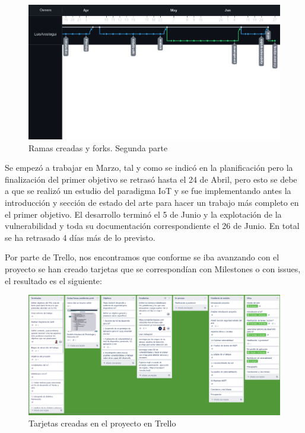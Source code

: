 \begin{figure}[ht!]
    \centering
    \includegraphics[width=\linewidth]{imagenes/canvas2.png}
    \caption{Ramas creadas y forks. Segunda parte}
    \label{fig:figure6-plan}
\end{figure}

Se empezó a trabajar en Marzo, tal y como se indicó en la planificación pero la finalización del primer objetivo se retrasó hasta el 24 de Abril, pero esto se debe a que se realizó un estudio del paradigma IoT y se fue implementando antes la introducción y sección de estado del arte para hacer un trabajo más completo en el primer objetivo. El desarrollo terminó el 5 de Junio y la explotación de la vulnerabilidad y toda su documentación correspondiente el 26 de Junio. En total se ha retrasado 4 días más de lo previsto. \\

\newpage

Por parte de Trello, nos encontramos que conforme se iba avanzando con el proyecto se han creado tarjetas que se correspondían con Milestones o con issues, el resultado es el siguiente:

\begin{figure}[hb!]
    \centering
    \includegraphics[width=\linewidth]{imagenes/trello.png}
    \caption{Tarjetas creadas en el proyecto en Trello}
    \label{fig:figure7-plan}
\end{figure}

